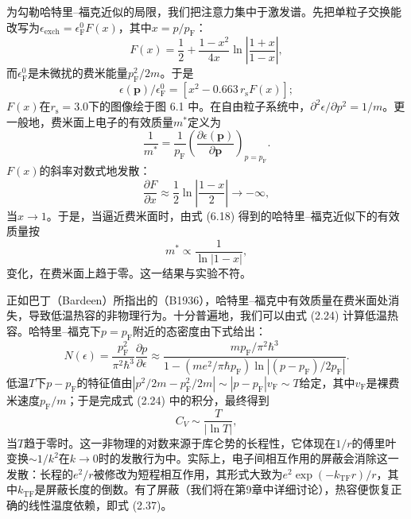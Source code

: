 为勾勒哈特里–福克近似的局限，我们把注意力集中于激发谱。先把单粒子交换能改写为$\epsilon_{\mathrm{exch}} = \epsilon_{\mathrm{F}}^0 F(x)$，其中$x = p/p_{\mathrm{F}}$：
\begin{equation*}
F(x) = \frac{1}{2} + \frac{1 - x^2}{4x}\ln\left|\frac{1 + x}{1 - x}\right|,
\tag{6.16}
\end{equation*}
而$\epsilon_{\mathrm{F}}^0$是未微扰的费米能量$p_{\mathrm{F}}^2/2m$。于是
\begin{equation*}
\epsilon(\mathbf{p})/\epsilon_{\mathrm{F}}^0 = \left[x^2 - 0.663\,r_{\mathrm{s}}F(x)\right];
\tag{6.17}
\end{equation*}
$F(x)$在$r_{\mathrm{s}} = 3.0$下的图像绘于图 6.1 中。在自由粒子系统中，$\partial^2\epsilon/\partial p^2 = 1/m$。更一般地，费米面上电子的有效质量$m^*$定义为
\begin{equation*}
\frac{1}{m^*} = \frac{1}{p_{\mathrm{F}}}\left(\frac{\partial\epsilon(\mathbf{p})}{\partial\mathbf{p}}\right)_{p = p_{\mathrm{F}}}.
\tag{6.18}
\end{equation*}
$F(x)$的斜率对数式地发散：
\begin{equation*}
\frac{\partial F}{\partial x} \approx \frac{1}{2}\ln\left|\frac{1 - x}{2}\right| \to -\infty,
\tag{6.19}
\end{equation*}
当$x \to 1$。于是，当逼近费米面时，由式 (6.18) 得到的哈特里–福克近似下的有效质量按
\begin{equation*}
m^* \propto \frac{1}{\ln|1 - x|},
\tag{6.20}
\end{equation*}
变化，在费米面上趋于零。这一结果与实验不符。

正如巴丁（Bardeen）所指出的（B1936），哈特里–福克中有效质量在费米面处消失，导致低温热容的非物理行为。十分普遍地，我们可以由式 (2.24) 计算低温热容。哈特里–福克下$p = p_{\mathrm{F}}$附近的态密度由下式给出：
\begin{equation*}
N(\epsilon) = \frac{p_{\mathrm{F}}^2}{\pi^2\hbar^3}\frac{\partial p}{\partial\epsilon} \approx \frac{mp_{\mathrm{F}}/\pi^2\hbar^3}{1 - (me^2/\pi\hbar p_{\mathrm{F}})\ln|(p - p_{\mathrm{F}})/2p_{\mathrm{F}}|}.
\tag{6.21}
\end{equation*}
低温$T$下$p - p_{\mathrm{F}}$的特征值由$|p^2/2m - p_{\mathrm{F}}^2/2m| \sim |p - p_{\mathrm{F}}|v_{\mathrm{F}} \sim T$给定，其中$v_{\mathrm{F}}$是裸费米速度$p_{\mathrm{F}}/m$；于是完成式 (2.24) 中的积分，最终得到
\begin{equation*}
C_V \sim \frac{T}{|\ln T|},
\tag{6.22}
\end{equation*}
当$T$趋于零时。这一非物理的对数来源于库仑势的长程性，它体现在$1/r$的傅里叶变换$\sim 1/k^2$在$k \to 0$时的发散行为中。实际上，电子间相互作用的屏蔽会消除这一发散：长程的$e^2/r$被修改为短程相互作用，其形式大致为$e^2\exp(-k_{\mathrm{TF}}r)/r$，其中$k_{\mathrm{TF}}$是屏蔽长度的倒数。有了屏蔽（我们将在第9章中详细讨论），热容便恢复正确的线性温度依赖，即式 (2.37)。

